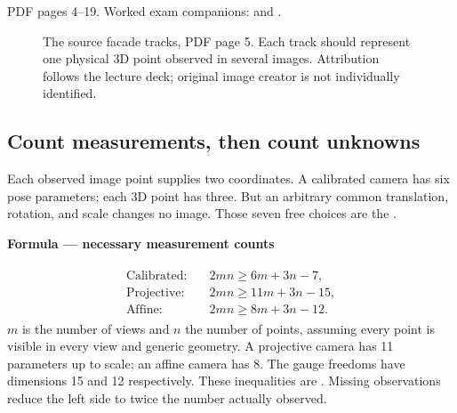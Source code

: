 \documentclass[letterpaper,11pt,english,openany,oneside]{jupyterBook}
\begin{document}
\sphinxAtStartPar
{} PDF pages 4–19. Worked exam companions: {\hyperref[\detokenize{lectures/lecture06/quiz-workbook:quiz-12-q1}]{}} and {\hyperref[\detokenize{lectures/lecture06/quiz-workbook:quiz-12-q2}]{}}.

\begin{figure}[H]
\centering
\capstart

\noindent{}
\caption{The source facade tracks, PDF page 5. Each track should represent one physical 3D point observed in several images. Attribution follows the lecture deck; original image creator is not individually identified.}\label{\detokenize{lectures/lecture06/ambiguity:fig-lec06-tracks}}\end{figure}


\subsection{Count measurements, then count unknowns}
\label{\detokenize{lectures/lecture06/ambiguity:count-measurements-then-count-unknowns}}
\sphinxAtStartPar
Each observed image point supplies two coordinates. A calibrated camera has six pose parameters; each 3D point has three. But an arbitrary common translation, rotation, and scale changes no image. Those seven free choices are the .

\begin{TextbookBox}
\textbf{Formula — necessary measurement counts}\par\smallskip
\begin{equation}\label{equation:lectures/lecture06/ambiguity:eq-lec06-counts}
\begin{split}\begin{aligned}
\text{Calibrated:}\quad&2mn\ge 6m+3n-7,\\
\text{Projective:}\quad&2mn\ge 11m+3n-15,\\
\text{Affine:}\quad&2mn\ge 8m+3n-12.
\end{aligned}\end{split}
\end{equation}
\sphinxAtStartPar
\(m\) is the number of views and \(n\) the number of points, assuming every point is visible in every view and generic geometry. A projective camera has 11 parameters up to scale; an affine camera has 8. The gauge freedoms have dimensions 15 and 12 respectively. These inequalities are . Missing observations reduce the left side to twice the number actually observed.

\end{TextbookBox}
\end{document}
